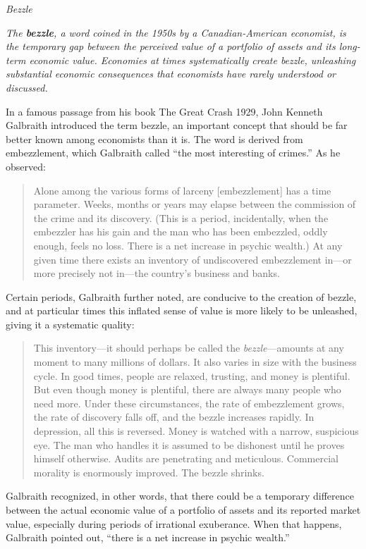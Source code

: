 \documentclass[
]{book}
\begin{document}
\emph{Bezzle}

\emph{The \textbf{bezzle}, a word coined in the 1950s by a Canadian-American economist, is the temporary gap between the perceived value of a portfolio of assets and its long-term economic value. Economies at times systematically create bezzle, unleashing substantial economic consequences that economists have rarely understood or discussed.}

In a famous passage from his book The Great Crash 1929, John Kenneth Galbraith introduced the term bezzle, an important concept that should be far better known among economists than it is. The word is derived from embezzlement, which Galbraith called ``the most interesting of crimes.'' As he observed:

\begin{quote}
Alone among the various forms of larceny {[}embezzlement{]} has a time parameter. Weeks, months or years may elapse between the commission of the crime and its discovery. (This is a period, incidentally, when the embezzler has his gain and the man who has been embezzled, oddly enough, feels no loss. There is a net increase in psychic wealth.) At any given time there exists an inventory of undiscovered embezzlement in---or more precisely not in---the country's business and banks.
\end{quote}

Certain periods, Galbraith further noted, are conducive to the creation of bezzle, and at particular times this inflated sense of value is more likely to be unleashed, giving it a systematic quality:

\begin{quote}
This inventory---it should perhaps be called the \emph{bezzle}---amounts at any moment to many millions of dollars. It also varies in size with the business cycle. In good times, people are relaxed, trusting, and money is plentiful. But even though money is plentiful, there are always many people who need more. Under these circumstances, the rate of embezzlement grows, the rate of discovery falls off, and the bezzle increases rapidly. In depression, all this is reversed. Money is watched with a narrow, suspicious eye. The man who handles it is assumed to be dishonest until he proves himself otherwise. Audits are penetrating and meticulous. Commercial morality is enormously improved. The bezzle shrinks.
\end{quote}

Galbraith recognized, in other words, that there could be a temporary difference between the actual economic value of a portfolio of assets and its reported market value, especially during periods of irrational exuberance. When that happens, Galbraith pointed out, ``there is a net increase in psychic wealth.''
\end{document}
